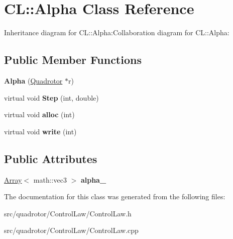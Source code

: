 \hypertarget{classCL_1_1Alpha}{
\section{CL::Alpha Class Reference}
\label{classCL_1_1Alpha}
}
Inheritance diagram for CL::Alpha:Collaboration diagram for CL::Alpha:\subsection*{Public Member Functions}
\begin{DoxyCompactItemize}
\item 
\hypertarget{classCL_1_1Alpha_a7144b55588a6fdd8d6e6270230c510a5}{
{\bfseries Alpha} (\hyperlink{classQuadrotor}{Quadrotor} $\ast$r)}
\label{classCL_1_1Alpha_a7144b55588a6fdd8d6e6270230c510a5}

\item 
\hypertarget{classCL_1_1Alpha_a3abee3653d7af651347097e67824151f}{
virtual void {\bfseries Step} (int, double)}
\label{classCL_1_1Alpha_a3abee3653d7af651347097e67824151f}

\item 
\hypertarget{classCL_1_1Alpha_a5425efcdfe00976a373a66fda1b51faa}{
virtual void {\bfseries alloc} (int)}
\label{classCL_1_1Alpha_a5425efcdfe00976a373a66fda1b51faa}

\item 
\hypertarget{classCL_1_1Alpha_a5c69fe1c1de2576c2db2c7724eaf909a}{
virtual void {\bfseries write} (int)}
\label{classCL_1_1Alpha_a5c69fe1c1de2576c2db2c7724eaf909a}

\end{DoxyCompactItemize}
\subsection*{Public Attributes}
\begin{DoxyCompactItemize}
\item 
\hypertarget{classCL_1_1Alpha_a27d343cf1970d5a561169bd8533d427b}{
\hyperlink{classArray}{Array}$<$ math::vec3 $>$ {\bfseries alpha\_\-}}
\label{classCL_1_1Alpha_a27d343cf1970d5a561169bd8533d427b}

\end{DoxyCompactItemize}


The documentation for this class was generated from the following files:\begin{DoxyCompactItemize}
\item 
src/quadrotor/ControlLaw/ControlLaw.h\item 
src/quadrotor/ControlLaw/ControlLaw.cpp\end{DoxyCompactItemize}
